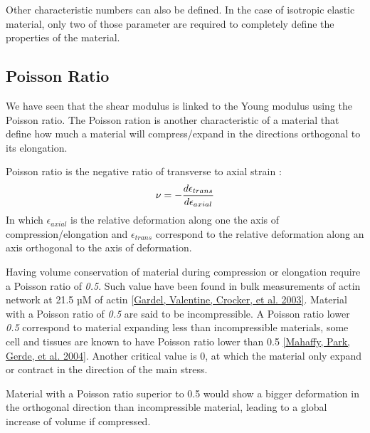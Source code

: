 \documentclass[A4paperpaper,11pt,english]{sphinxmanual}
\begin{document}
Other characteristic numbers can also be defined. In the case of isotropic
elastic material, only two of those parameter are required to completely define
the properties of the material.


\subsection{Poisson Ratio}
\label{parts/part1:poisson-ratio}
We have seen that the shear modulus is linked to the Young modulus using
the Poisson ratio.  The Poisson ration is another characteristic of a material
that define how much a material will compress/expand in the directions
orthogonal to its elongation.

Poisson ratio is the negative ratio of transverse to axial strain :
\begin{gather}
\begin{split}\nu = - \frac{
    d \epsilon_{trans}
}{
    d \epsilon_{axial}
}\end{split}\notag
\end{gather}
In which \(\epsilon_{axial}\) is the relative deformation along one the
axis of compression/elongation and \(\epsilon_{trans}\) correspond to the
relative deformation along an axis orthogonal to the axis of deformation.

Having volume conservation of material during compression or elongation require
a Poisson ratio of \emph{0.5}. Such value have been found in bulk measurements of
actin network at 21.5 µM of actin {\hyperref[parts/part1:gardel2003]{{[}Gardel, Valentine, Crocker,  et al.  2003{]}}}. Material with a Poisson ratio of \emph{0.5} are
said to be incompressible. A Poisson ratio lower \emph{0.5} correspond to material
expanding less than incompressible materials, some cell and tissues are known to
have Poisson ratio lower than 0.5 {\hyperref[parts/part1:mahaffy2004]{{[}Mahaffy, Park, Gerde,  et al.  2004{]}}}. Another critical value
is 0, at which the material only expand or contract in the direction of the
main stress.

Material with a Poisson ratio superior to 0.5 would show a bigger
deformation in the orthogonal direction than incompressible material, leading
to a global increase of volume if compressed.
\end{document}
